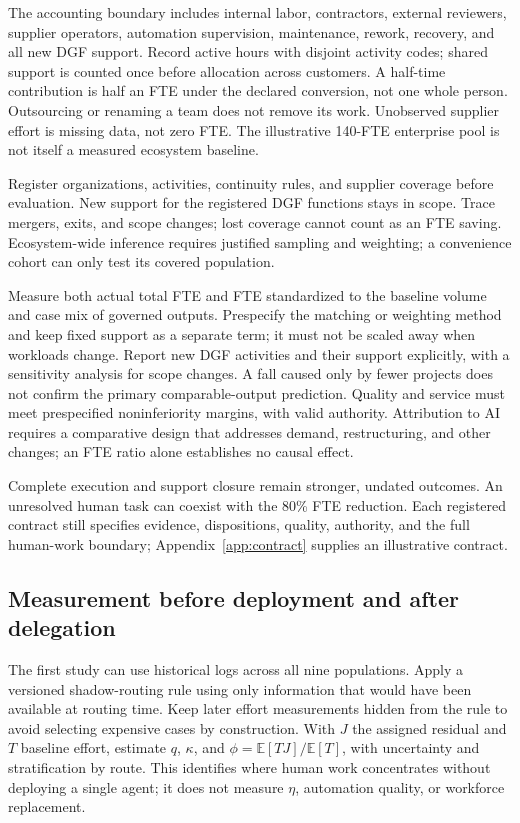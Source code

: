 The accounting boundary includes internal labor, contractors, external reviewers, supplier operators,
automation supervision, maintenance, rework, recovery, and all new DGF support. Record active hours
with disjoint activity codes; shared support is counted once before allocation across customers.
A half-time contribution is half an FTE under the declared conversion, not one whole person.
Outsourcing or renaming a team does not remove its work. Unobserved supplier effort is missing data,
not zero FTE. The illustrative 140-FTE enterprise pool is not itself a measured ecosystem baseline.

Register organizations, activities, continuity rules, and supplier coverage before evaluation.
New support for the registered DGF functions stays in scope. Trace mergers, exits, and scope changes;
lost coverage cannot count as an FTE saving. Ecosystem-wide inference requires justified sampling and
weighting; a convenience cohort can only test its covered population.

Measure both actual total FTE and FTE standardized to the baseline volume and case mix of governed
outputs. Prespecify the matching or weighting method and keep fixed support as a separate term;
it must not be scaled away when workloads change. Report new DGF activities and their support
explicitly, with a sensitivity analysis for scope changes. A fall caused only by fewer projects does
not confirm the primary comparable-output prediction. Quality and service must meet prespecified
noninferiority margins, with valid authority. Attribution to AI requires a comparative design that
addresses demand, restructuring, and other changes; an FTE ratio alone establishes no causal effect.

Complete execution and support closure remain stronger, undated outcomes. An unresolved human task
can coexist with the 80\% FTE reduction. Each registered contract still specifies evidence,
dispositions, quality, authority, and the full human-work boundary;
Appendix~\ref{app:contract} supplies an illustrative contract.

\subsection{Measurement before deployment and after delegation}

The first study can use historical logs across all nine populations. Apply a versioned shadow-routing
rule using only information that would have been available at routing time. Keep later effort
measurements hidden from the rule to avoid selecting expensive cases by construction. With $J$ the
assigned residual and $T$ baseline effort, estimate $q$, $\kappa$, and $\phi=\mathbb{E}[TJ]/\mathbb{E}[T]$,
with uncertainty and stratification by route. This identifies where human work concentrates without
deploying a single agent; it does not measure $\eta$, automation quality, or workforce replacement.

